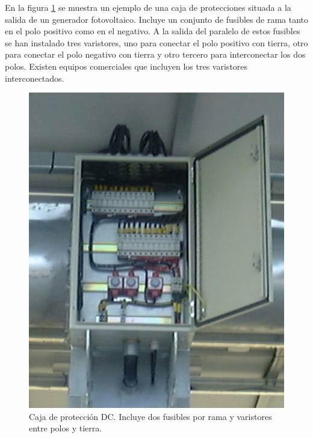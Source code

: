 En la figura \ref{fig:Caja-de-protecci=0000F3n} se muestra un ejemplo
de una caja de protecciones situada a la salida de un generador fotovoltaico.
Incluye un conjunto de fusibles de rama tanto en el polo positivo
como en el negativo. A la salida del paralelo de estos fusibles se
han instalado tres varistores, uno para conectar el polo positivo
con tierra, otro para conectar el polo negativo con tierra y otro
tercero para interconectar los dos polos. Existen equipos comerciales
que incluyen los tres varistores interconectados.

%
\begin{figure}
\begin{centering}
\includegraphics[scale=0.5]{../figs/CajaProteccionesPhotocampa}
\end{centering}

\caption[Caja de protección DC]{Caja de protección DC. Incluye dos fusibles por rama y varistores
entre polos y tierra.\label{fig:Caja-de-protecci=0000F3n}}

\end{figure}



